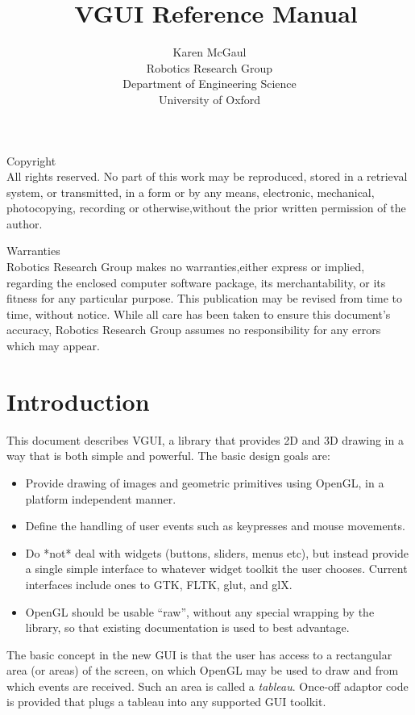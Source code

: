 \documentclass[12pt]{report} \usepackage{epsfig}
\begin{document}
\title {\ VGUI Reference Manual }

\author{Karen McGaul \\ Robotics Research Group \\ Department of
  Engineering Science\\ University of Oxford}

\maketitle
{}

{\sf\large Copyright} \\
All rights reserved. No part of this work may be reproduced, stored in
a retrieval system, or transmitted, in a form or by any means,
electronic, mechanical, photocopying, recording or otherwise,without
the prior written permission of the author.

\bigskip

{\sf\large Warranties} \\
Robotics Research Group makes no warranties,either express or implied,
regarding the enclosed computer software package, its merchantability,
or its fitness for any particular purpose. This publication may be
revised from time to time, without notice.
While all care has been taken to ensure this document's accuracy,
Robotics Research Group assumes no responsibility for any errors which
may appear.

\newpage
\tableofcontents
\newpage

\chapter{Introduction}

This document describes VGUI, a library that provides 2D and 3D drawing in a way
that is both simple and powerful.  The basic design goals are:
\begin{itemize}
\item   Provide drawing of images and geometric primitives using OpenGL,
        in a platform independent manner.
\item   Define the handling of user events such as keypresses and mouse
        movements.
\item   Do *not* deal with widgets (buttons, sliders, menus etc), but
        instead provide a single simple interface to whatever widget
        toolkit the user chooses.  Current interfaces include ones to GTK, FLTK,
        glut, and glX.
\item   OpenGL should be usable ``raw'', without any special wrapping by the
        library, so that existing documentation is used to best advantage.
\end{itemize}
The basic concept in the new GUI is that the user has access to a rectangular area
(or areas) of the screen, on which OpenGL may be used to draw and from
which events are received.  Such an area is called a {\it tableau}.
Once-off adaptor code is provided that plugs a tableau into any supported GUI toolkit.
\end{document}
